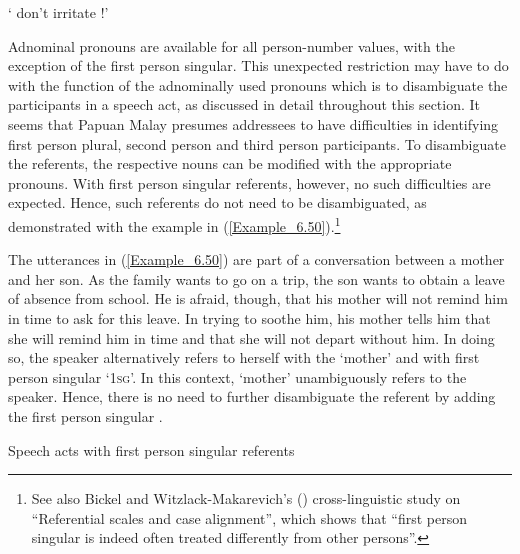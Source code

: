  ‘ don’t irritate !’ \textstyleExampleSource{[081023-001-Cv.0038]}
\z



Adnominal pronouns are available for all person-number values, with the exception of the first person singular. This unexpected restriction may have to do with the function of the adnominally used pronouns which is to disambiguate the participants in a speech act, as discussed in detail throughout this section. It seems that Papuan Malay presumes addressees to have difficulties in identifying first person plural, second person and third person participants. To disambiguate the referents, the respective nouns can be modified with the appropriate pronouns. With first person singular referents, however, no such difficulties are expected. Hence, such referents do not need to be disambiguated, as demonstrated with the example in (\ref{Example_6.50}).\footnote{See also Bickel and Witzlack-Makarevich’s (\citeyear*[15]{Bickel.2008}) cross-linguistic study on “Referential scales and case alignment”, which shows that “first person singular is indeed often treated differently from other persons”.}



The utterances in (\ref{Example_6.50}) are part of a conversation between a mother and her son. As the family wants to go on a trip, the son wants to obtain a leave of absence from school. He is afraid, though, that his mother will not remind him in time to ask for this leave. In trying to soothe him, his mother tells him that she will remind him in time and that she will not depart without him. In doing so, the speaker alternatively refers to herself with the   ‘mother’ and with first person singular  ‘\textsc{1sg}’. In this context,  ‘mother’ unambiguously refers to the speaker. Hence, there is no need to further disambiguate the referent by adding the first person singular .



\begin{styleExampleTitle}
Speech acts with first person singular referents
\end{styleExampleTitle}

